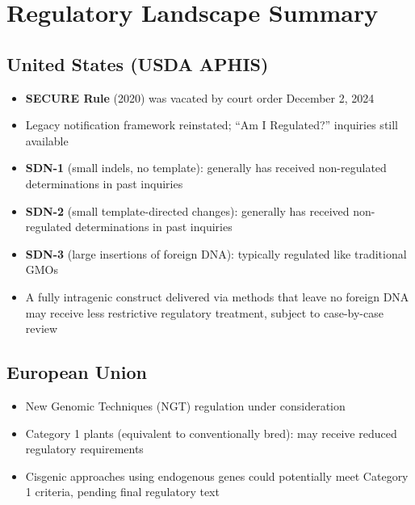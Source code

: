 \documentclass[12pt,a4paper]{article}
\begin{document}
\section{Regulatory Landscape Summary}
\label{sec:regulatory}

\begin{center}
\end{center}

\subsection{United States (USDA APHIS)}
\begin{itemize}
  \item \textbf{SECURE Rule} (2020) was vacated by court order December 2, 2024
  \item Legacy notification framework reinstated; ``Am I Regulated?'' inquiries still available
  \item \textbf{SDN-1} (small indels, no template): generally has received non-regulated determinations in past inquiries
  \item \textbf{SDN-2} (small template-directed changes): generally has received non-regulated determinations in past inquiries
  \item \textbf{SDN-3} (large insertions of foreign DNA): typically regulated like traditional GMOs
  \item A fully intragenic construct delivered via methods that leave no foreign DNA may receive less restrictive regulatory treatment, subject to case-by-case review
\end{itemize}

\subsection{European Union}
\begin{itemize}
  \item New Genomic Techniques (NGT) regulation under consideration
  \item Category 1 plants (equivalent to conventionally bred): may receive reduced regulatory requirements
  \item Cisgenic approaches using endogenous genes could potentially meet Category 1 criteria, pending final regulatory text
\end{itemize}
\end{document}
